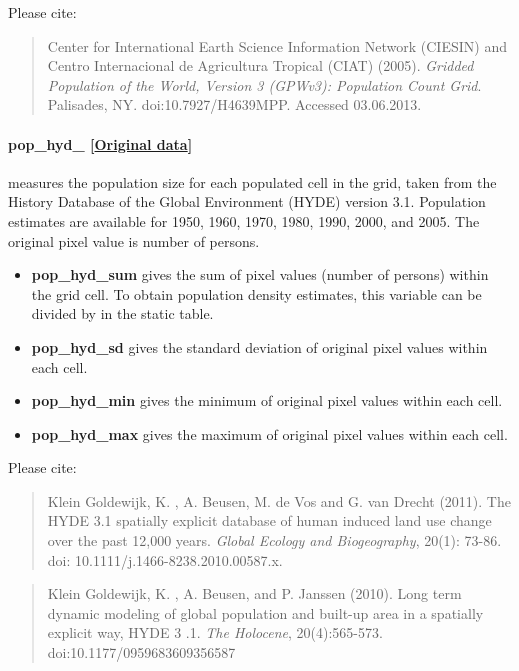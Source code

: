 \documentclass[]{book}
\begin{document}
Please cite:

\begin{quote}
Center for International Earth Science Information Network (CIESIN) and
Centro Internacional de Agricultura Tropical (CIAT) (2005).
\emph{Gridded Population of the World, Version 3 (GPWv3): Population
Count Grid}. Palisades, NY. doi:10.7927/H4639MPP. Accessed 03.06.2013.
\end{quote}

\paragraph{pop\_hyd\_
{[}\href{http://themasites.pbl.nl/tridion/en/themasites/hyde/download/index-2.html}{Original
data}{]}}\label{pop-hyd-}

measures the population size for each populated cell in the grid, taken
from the History Database of the Global Environment (HYDE) version 3.1.
Population estimates are available for 1950, 1960, 1970, 1980, 1990,
2000, and 2005. The original pixel value is number of persons.

\begin{itemize}
\itemsep1pt\parskip0pt
\item
  \textbf{pop\_hyd\_sum} gives the sum of pixel values (number of
  persons) within the grid cell. To obtain population density estimates,
  this variable can be divided by in the static table.
\item
  \textbf{pop\_hyd\_sd} gives the standard deviation of original pixel
  values within each cell.
\item
  \textbf{pop\_hyd\_min} gives the minimum of original pixel values
  within each cell.
\item
  \textbf{pop\_hyd\_max} gives the maximum of original pixel values
  within each cell.
\end{itemize}

Please cite:

\begin{quote}
Klein Goldewijk, K. , A. Beusen, M. de Vos and G. van Drecht (2011). The
HYDE 3.1 spatially explicit database of human induced land use change
over the past 12,000 years. \emph{Global Ecology and Biogeography},
20(1): 73-86. doi: 10.1111/j.1466-8238.2010.00587.x.
\end{quote}

\begin{quote}
Klein Goldewijk, K. , A. Beusen, and P. Janssen (2010). Long term
dynamic modeling of global population and built-up area in a spatially
explicit way, HYDE 3 .1. \emph{The Holocene}, 20(4):565-573.
doi:10.1177/0959683609356587
\end{quote}
\end{document}
